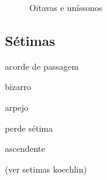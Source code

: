 \documentclass{article}
\begin{document}
\begin{figure}
{  }
  \qquad
  \caption{Oitavas e uníssonos}
  \label{fig:oitavas-e-unissonos}
\end{figure}

\subsection{Sétimas}
\label{sec:setimas}

acorde de passagem

bizarro

arpejo

perde sétima

ascendente

(ver setimas koechlin)
\end{document}
